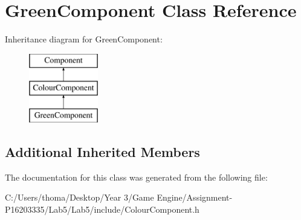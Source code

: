 \hypertarget{class_green_component}{}\section{Green\+Component Class Reference}
\label{class_green_component}
Inheritance diagram for Green\+Component\+:\begin{figure}[H]
\begin{center}
\leavevmode
\includegraphics[height=3.000000cm]{class_green_component}
\end{center}
\end{figure}
\subsection*{Additional Inherited Members}


The documentation for this class was generated from the following file\+:\begin{DoxyCompactItemize}
\item 
C\+:/\+Users/thoma/\+Desktop/\+Year 3/\+Game Engine/\+Assignment-\/\+P16203335/\+Lab5/\+Lab5/include/Colour\+Component.\+h\end{DoxyCompactItemize}
